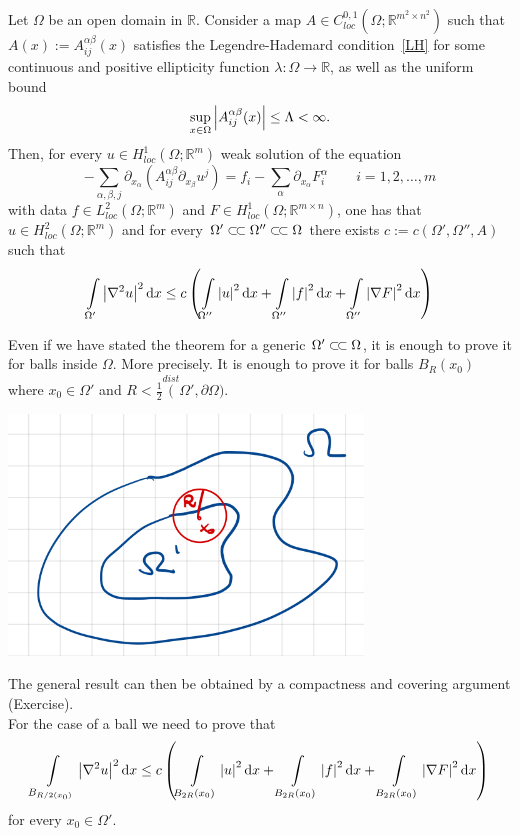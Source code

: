 \begin{thm}[\(H^{2}\)-regularity]
	Let \( \Omega  \) be an open domain in \( \mathbb{R} \). Consider a map \( A\in C_{loc}^{0,1}(\Omega ; \mathbb{R}^{m^{2}\times n^{2}})  \)
	such that \( A(x) := A_{ij}^{\alpha \beta }(x)\) satisfies the Legendre-Hademard condition~\eqref{LH} for some continuous and positive ellipticity function \( \lambda : \Omega \to \mathbb{R}\),
	as well as the uniform bound
	\[ \sup_{x \in \Omega } \left\lvert A_{ij}^{\alpha \beta }(x)\right\rvert\leq \Lambda < \infty. \] Then,
	for every \( u \in H_{loc}^{1}(\Omega ; \mathbb{R}^{m})  \) weak solution of the equation \[ - \sum\limits_{\alpha ,\beta ,j}^{}\partial_{x_{\alpha }}(A_{ij}^{\alpha \beta }\partial_{x_{\beta}}u^{j}) = f_{i}-\sum\limits_{\alpha}^{} \partial_{x_{\alpha }}F_{i}^{\alpha } \qquad i=1,2,\ldots,m  \]
	with data \( f \in L_{loc}^{2}(\Omega ;\mathbb{R}^{m}) \) and \( F \in H_{loc}^{1}(\Omega ;\mathbb{R}^{m \times n})  \), one  has that \( u \in H_{loc}^{2}(\Omega ; \mathbb{R}^{m})  \) and for every \( \Omega' \ssubset \Omega'' \ssubset \Omega \) there exists \( c:=c(\Omega', \Omega'', A)  \) such that
	\[ \int\limits_{\Omega'}^{} \left\lvert\nabla ^{2}u\right\rvert^{2} \mathop{}\!\mathrm{d}x \leq c \left( \int\limits_{\Omega''}^{} \left\lvert u\right\rvert^{2} \mathop{}\!\mathrm{d}x + \int\limits_{\Omega''}^{} \left\lvert f\right\rvert^{2} \mathop{}\!\mathrm{d}x + \int\limits_{\Omega''}^{} \left\lvert\nabla F\right\rvert^{2} \mathop{}\!\mathrm{d}x \right) \]
\end{thm}

\begin{remark}
	Even if we have stated the theorem for a generic \( \Omega' \ssubset \Omega  \), it is enough to prove it for balls inside \( \Omega  \).
	More precisely. It is enough to prove it for balls \( B_{R}(x_{0}) \) where \( x_{0}\in \Omega' \) and \( R < \frac{1}{2}\overset{dist}(\Omega', \partial \Omega )  \).
	\begin{center}
		\includegraphics[scale=0.45]{pictures/picture02.png}
	\end{center}
	The general result can then be obtained by a compactness and covering argument (Exercise).\\
	For the case of a ball we need to prove that
	\[ \int\limits_{B_{\frac{R}{2}(x_{0}) }}^{} \abs{\nabla ^{2}u}^{2} \dd{x} \leq c \left( \int\limits_{B_{2R}(x_{0})}^{} \abs{u}^{2} \dd{x} + \int\limits_{B_{2R}(x_{0})}^{} \abs{f}^{2} \dd{x} + \int\limits_{B_{2R}(x_{0})}^{} \abs{\nabla F}^{2} \dd{x} \right) \] for every \( x_{0} \in \Omega' \).
\end{remark}

